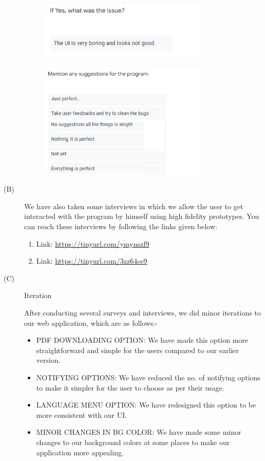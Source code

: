 \documentclass[acmtog]{acmart}
\begin{document}
\begin{description}
\begin{figure}[H]
    \end{figure}
    \begin{figure}[H]
        \includegraphics[width=8cm]{Evaluation/q5.jpg}
    \end{figure}
    \begin{figure}[H]
        \includegraphics[width=8cm]{Evaluation/q6.jpg}
    \end{figure}

    \item[(B)] We have also taken some interviews in which we allow the user to get interacted with the program by himself using high fidelity prototypes. You can reach these interviews by following the links given below:

    \begin{enumerate}
        \item Link: \url{https://tinyurl.com/ymynszf9}
        \item Link: \url{https://tinyurl.com/3zz64ce9}
    \end{enumerate}

    \item[(C)] Iteration
 
    After conducting several surveys and interviews, we did minor iterations to our web application, which are as follows:-

    \begin{itemize}
        \item PDF DOWNLOADING OPTION: We have made this option more straightforward and simple for the users compared to our earlier version. 
        \item NOTIFYING OPTIONS: We have reduced the no. of notifying options to make it simpler for the user to choose as per their usage.
        \item LANGUAGE MENU OPTION: We have redesigned this option to be more consistent with our UI.
        \item MINOR CHANGES IN BG COLOR: We have made some minor changes to our background colors at some places to make our application more appealing.
    \end{itemize}

\end{description}
\end{document}
